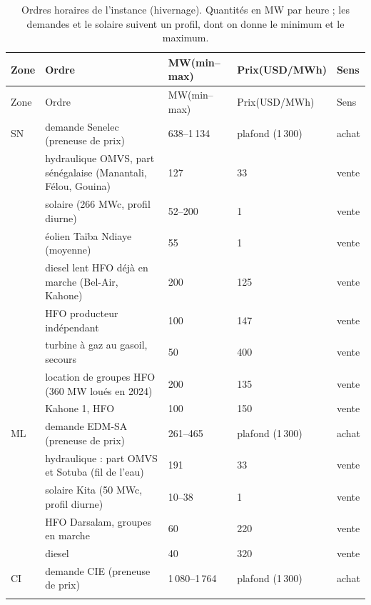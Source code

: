 
\begin{longtable}{p{1.2cm}p{7.9cm}p{2.3cm}p{2.1cm}p{1.5cm}}
\caption{Ordres horaires de l'instance (hivernage). Quantités en MW par heure ; les demandes et le solaire suivent un profil, dont on donne le minimum et le maximum.}\label{tab:annexe-horaires}\\
\toprule Zone & Ordre & MW\newline (min--max) & Prix\newline (USD/MWh) & Sens \\ \midrule \endfirsthead
\toprule Zone & Ordre & MW\newline (min--max) & Prix\newline (USD/MWh) & Sens \\ \midrule \endhead
\bottomrule \endfoot
SN & demande Senelec (preneuse de prix) & 638--1\,134 & plafond (1\,300) & achat \\ \rowsep
 & hydraulique OMVS, part sénégalaise (Manantali, Félou, Gouina) & 127 & 33 & vente \\ \rowsep
 & solaire (266 MWc, profil diurne) & 52--200 & 1 & vente \\ \rowsep
 & éolien Taïba Ndiaye (moyenne) & 55 & 1 & vente \\ \rowsep
 & diesel lent HFO déjà en marche (Bel-Air, Kahone) & 200 & 125 & vente \\ \rowsep
 & HFO producteur indépendant & 100 & 147 & vente \\ \rowsep
 & turbine à gaz au gasoil, secours & 50 & 400 & vente \\ \rowsep
 & location de groupes HFO (360 MW loués en 2024) & 200 & 135 & vente \\ \rowsep
 & Kahone 1, HFO & 100 & 150 & vente \\ \rowsep
ML & demande EDM-SA (preneuse de prix) & 261--465 & plafond (1\,300) & achat \\ \rowsep
 & hydraulique : part OMVS et Sotuba (fil de l'eau) & 191 & 33 & vente \\ \rowsep
 & solaire Kita (50 MWc, profil diurne) & 10--38 & 1 & vente \\ \rowsep
 & HFO Darsalam, groupes en marche & 60 & 220 & vente \\ \rowsep
 & diesel & 40 & 320 & vente \\ \rowsep
CI & demande CIE (preneuse de prix) & 1\,080--1\,764 & plafond (1\,300) & achat \\ \rowsep

\end{longtable}
